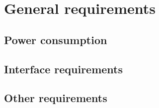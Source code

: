 \section{General requirements}

\subsection{Power consumption}

\subsection{Interface requirements}

\subsection{Other requirements}
